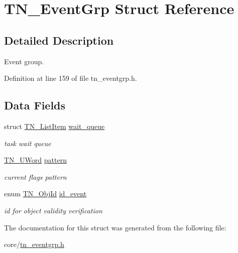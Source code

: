 \hypertarget{structTN__EventGrp}{\section{T\+N\+\_\+\+Event\+Grp Struct Reference}
\label{structTN__EventGrp}
}


\subsection{Detailed Description}
Event group. 

Definition at line 159 of file tn\+\_\+eventgrp.\+h.

\subsection*{Data Fields}
\begin{DoxyCompactItemize}
\item 
\hypertarget{structTN__EventGrp_a93da04331cafe905f9c8b2fa2bad648b}{struct \hyperlink{structTN__ListItem}{T\+N\+\_\+\+List\+Item} \hyperlink{structTN__EventGrp_a93da04331cafe905f9c8b2fa2bad648b}{wait\+\_\+queue}}\label{structTN__EventGrp_a93da04331cafe905f9c8b2fa2bad648b}

\begin{DoxyCompactList}\small\item\em task wait queue \end{DoxyCompactList}\item 
\hypertarget{structTN__EventGrp_abf45ee25e11ea46636920be5003cdec2}{\hyperlink{tn__arch__example_8h_ab80cba0fe9ffcd9011d53dfeb9e39bf4}{T\+N\+\_\+\+U\+Word} \hyperlink{structTN__EventGrp_abf45ee25e11ea46636920be5003cdec2}{pattern}}\label{structTN__EventGrp_abf45ee25e11ea46636920be5003cdec2}

\begin{DoxyCompactList}\small\item\em current flags pattern \end{DoxyCompactList}\item 
\hypertarget{structTN__EventGrp_a0bdf55b6117237122efeefcdf6802d37}{enum \hyperlink{tn__common_8h_ae779dd1f6735f6e139fb70acd004d976}{T\+N\+\_\+\+Obj\+Id} \hyperlink{structTN__EventGrp_a0bdf55b6117237122efeefcdf6802d37}{id\+\_\+event}}\label{structTN__EventGrp_a0bdf55b6117237122efeefcdf6802d37}

\begin{DoxyCompactList}\small\item\em id for object validity verification \end{DoxyCompactList}\end{DoxyCompactItemize}


The documentation for this struct was generated from the following file\+:\begin{DoxyCompactItemize}
\item 
core/\hyperlink{tn__eventgrp_8h}{tn\+\_\+eventgrp.\+h}\end{DoxyCompactItemize}
